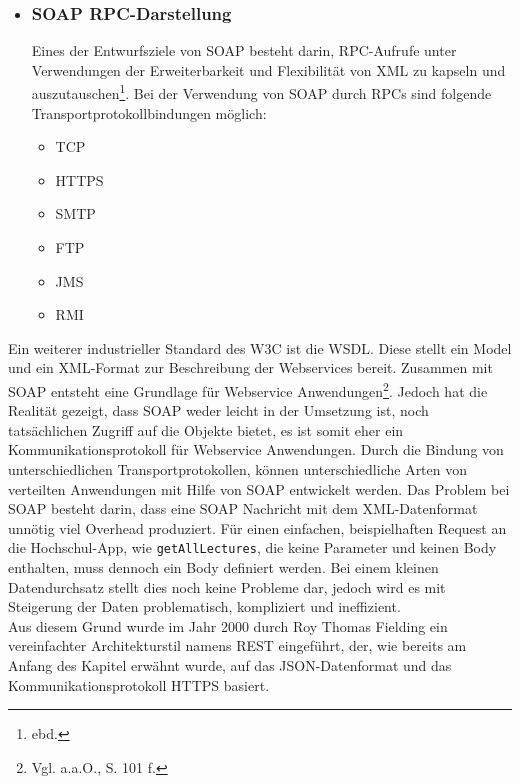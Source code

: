 \begin{itemize}
\item \subsubsection*{SOAP RPC-Darstellung} 
Eines der Entwurfsziele von \ac{SOAP} besteht darin, \ac{RPC}-Aufrufe unter Verwendungen der Erweiterbarkeit und Flexibilität von \ac{XML} zu kapseln und auszutauschen\footnote{ebd.}.
Bei der Verwendung von \ac{SOAP} durch \acp{RPC} sind folgende Transportprotokollbindungen möglich\autocite[Vgl.][85\psq]{soamws}:
\begin{itemize}
\item \ac{TCP}
\item \ac{HTTPS}
\item \ac{SMTP}
\item \ac{FTP}
\item \ac{JMS}
\item \ac{RMI}
\end{itemize}

\end{itemize}

Ein weiterer industrieller Standard des \ac{W3C} ist die \ac{WSDL}. Diese stellt ein Model und ein \ac{XML}-Format zur Beschreibung der Webservices bereit. Zusammen mit \ac{SOAP} entsteht eine Grundlage für Webservice Anwendungen\footnote{Vgl. a.a.O., S. 101 f.}.
Jedoch hat die Realität gezeigt, dass \ac{SOAP} weder leicht in der Umsetzung ist, noch tatsächlichen Zugriff auf die Objekte bietet, es ist somit eher ein Kommunikationsprotokoll für Webservice Anwendungen. Durch die Bindung von unterschiedlichen Transportprotokollen, können unterschiedliche Arten von verteilten Anwendungen mit Hilfe von \ac{SOAP} entwickelt werden. Das Problem bei \ac{SOAP} besteht darin, dass eine \ac{SOAP} Nachricht mit dem \ac{XML}-Datenformat unnötig viel Overhead produziert. Für einen einfachen, beispielhaften Request an die Hochschul-\ac{App}, wie \lstinline[columns=fixed]{getAllLectures},%
die keine Parameter und keinen Body enthalten, muss dennoch ein Body definiert werden. Bei einem kleinen Datendurchsatz stellt dies noch keine Probleme dar, jedoch wird es mit Steigerung der Daten problematisch, kompliziert und ineffizient\autocite[Vgl][57\psq]{jws}.
\\
\linebreak
Aus diesem Grund wurde im Jahr 2000 durch Roy Thomas Fielding ein vereinfachter Architekturstil namens \ac{REST} eingeführt, der, wie bereits am Anfang des Kapitel erwähnt wurde, auf das \ac{JSON}-Datenformat und das Kommunikationsprotokoll \ac{HTTPS} basiert\autocite[Vgl][77\psq]{jws}.

